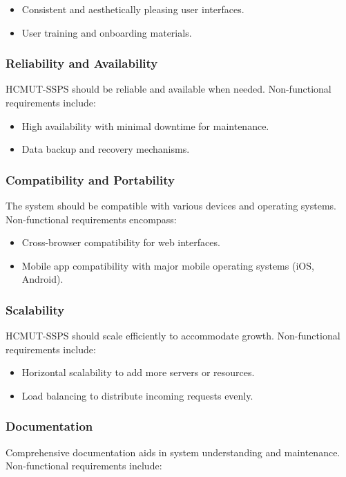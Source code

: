 \documentclass{article}
\begin{document}
\begin{itemize}
    \item Consistent and aesthetically pleasing user interfaces.
    \item User training and onboarding materials.
\end{itemize}

\subsubsection{Reliability and Availability}
HCMUT-SSPS should be reliable and available when needed. Non-functional
requirements include:

\begin{itemize}
    \item High availability with minimal downtime for maintenance.
    \item Data backup and recovery mechanisms.
\end{itemize}

\subsubsection{Compatibility and Portability}
The system should be compatible with various devices and operating systems. Non-functional requirements encompass:

\begin{itemize}
    \item Cross-browser compatibility for web interfaces.
    \item Mobile app compatibility with major mobile operating systems (iOS, Android).
\end{itemize}

\subsubsection{Scalability}
HCMUT-SSPS should scale efficiently to accommodate growth. Non-functional requirements include:

\begin{itemize}
    \item Horizontal scalability to add more servers or resources.
    \item Load balancing to distribute incoming requests evenly.
\end{itemize}

\subsubsection{Documentation}
Comprehensive documentation aids in system understanding and maintenance. Non-functional requirements include:
\end{document}
